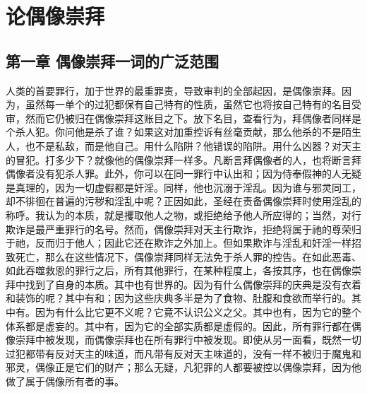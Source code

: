 
\chapter{论偶像崇拜}



\section{第一章 偶像崇拜一词的广泛范围}

人类的首要罪行，加于世界的最重罪责，导致审判的全部起因，是偶像崇拜。因为，虽然每一单个的过犯都保有自己特有的性质，虽然它也将按自己特有的名目受审，然而它仍被归在偶像崇拜这账目之下。放下名目，查看行为，拜偶像者同样是个杀人犯。你问他是杀了谁？如果这对加重控诉有丝毫贡献，那么他杀的不是陌生人，也不是私敌，而是他自己。用什么陷阱？他错误的陷阱。用什么凶器？对天主的冒犯。打多少下？就像他的偶像崇拜一样多。凡断言拜偶像者的人，也将断言拜偶像者没有犯杀人罪。此外，你可以在同一罪行中认出和；因为侍奉假神的人无疑是真理的，因为一切虚假都是奸淫。同样，他也沉溺于淫乱。因为谁与邪灵同工，却不徘徊在普遍的污秽和淫乱中呢？正因如此，圣经在责备偶像崇拜时使用淫乱的称呼。我认为的本质，就是攫取他人之物，或拒绝给予他人所应得的；当然，对行欺诈是最严重罪行的名号。然而，偶像崇拜对天主行欺诈，拒绝将属于祂的尊荣归于祂，反而归于他人；因此它还在欺诈之外加上。但如果欺诈与淫乱和奸淫一样招致死亡，那么在这些情况下，偶像崇拜同样无法免于杀人罪的控告。在如此恶毒、如此吞噬救恩的罪行之后，所有其他罪行，在某种程度上，各按其序，也在偶像崇拜中找到了自身的本质。其中也有世界的。因为有什么偶像崇拜的庆典是没有衣着和装饰的呢？其中有和；因为这些庆典多半是为了食物、肚腹和食欲而举行的。其中有。因为有什么比它更不义呢？它竟不认识公义之父。其中也有，因为它的整个体系都是虚妄的。其中有，因为它的全部实质都是虚假的。因此，所有罪行都在偶像崇拜中被发现，而偶像崇拜也在所有罪行中被发现。即使从另一面看，既然一切过犯都带有反对天主的味道，而凡带有反对天主味道的，没有一样不被归于魔鬼和邪灵，偶像正是它们的财产；那么无疑，凡犯罪的人都要被控以偶像崇拜，因为他做了属于偶像所有者的事。\par

